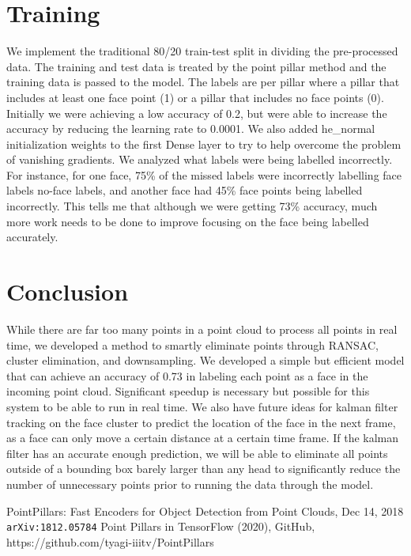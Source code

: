\documentclass{article}
\begin{document}
\section{Training}
We implement the traditional 80/20 train-test split in dividing the pre-processed data. The training and test data is treated by the point pillar method and the training data is passed to the model. The labels are per pillar where a pillar that includes at least one face point (1) or a pillar that includes no face points (0). Initially we were achieving a low accuracy of 0.2, but were able to increase the accuracy by reducing the learning rate to 0.0001. We also added he{\_}normal initialization weights to the first Dense layer to try to help overcome the problem of vanishing gradients. We analyzed what labels were being labelled incorrectly. For instance, for one face, 75{\%} of the missed labels were incorrectly labelling face labels no-face labels, and another face had 45{\%} face points being labelled incorrectly. This tells me that although we were getting 73{\%} accuracy, much more work needs to be done to improve focusing on the face being labelled accurately.  
\section{Conclusion}
While there are far too many points in a point cloud to process all points in real time, we developed a method to smartly eliminate points through RANSAC, cluster elimination, and downsampling. We developed a simple but efficient model that can achieve an accuracy of 0.73 in labeling each point as a face in the incoming point cloud. Significant speedup is necessary but possible for this system to be able to run in real time. We also have future ideas for kalman filter tracking on the face cluster to predict the location of the face in the next frame, as a face can only move a certain distance at a certain time frame. If the kalman filter has an accurate enough prediction, we will be able to eliminate all points outside of a bounding box barely larger than any head to significantly reduce the number of unnecessary points prior to running the data through the model. 
\begin{thebibliography}{9}
PointPillars: Fast Encoders for Object Detection from Point Clouds, Dec 14, 2018
\\\texttt{arXiv:1812.05784}
Point Pillars in TensorFlow (2020), GitHub, https://github.com/tyagi-iiitv/PointPillars
\end{thebibliography}
\end{document}
